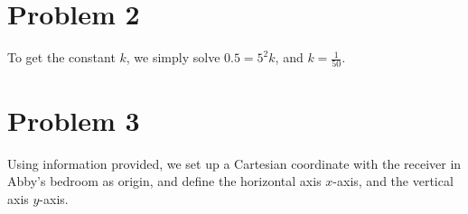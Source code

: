 \documentclass[12pt,a4paper]{article}
\begin{document}
\section*{Problem 2}
\begin{solution}
    To get the constant $k$, we simply solve $0.5= 5^{2}k$, and $k = \frac{1}{50}$.
\end{solution}

\section*{Problem 3}
\begin{solution}
Using information provided, we set up a Cartesian coordinate with the receiver in Abby's bedroom as origin, and define the horizontal axis $x$-axis, and the vertical axis $y$-axis.

\begin{figure}[H]
    \centering
\end{figure}
\end{solution}
\end{document}
